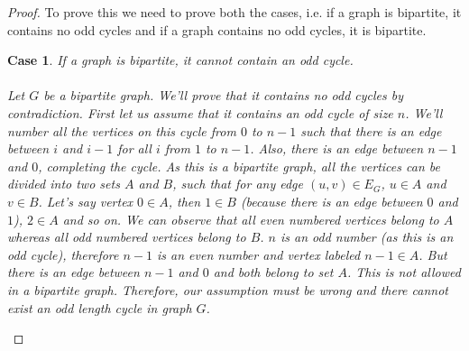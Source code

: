 \documentclass{article}
\newtheorem{case}{Case}
\begin{document}
\begin{proof}
    To prove this we need to prove both the cases, i.e. if a graph is bipartite, it contains no odd cycles and if a graph contains no odd cycles, it is bipartite.\\

    \begin{case}
        If a graph is bipartite, it cannot contain an odd cycle.\\
        \\
        Let $G$ be a bipartite graph. We'll prove that it contains no odd cycles by contradiction. First let us assume that it contains an odd cycle of size $n$. We'll number all the vertices on this cycle from $0$ to $n-1$ such that there is an edge between $i$ and $i-1$ for all $i$ from $1$ to $n-1$. Also, there is an edge between $n-1$ and $0$, completing the cycle. As this is a bipartite graph, all the vertices can be divided into two sets $A$ and $B$, such that for any edge $(u,v) \in E_{G}$, $u \in A$ and $v \in B$. Let's say vertex $0 \in A$, then $1 \in B$ (because there is an edge between $0$ and $1$), $2 \in A$ and so on. We can observe that all even numbered vertices belong to $A$ whereas all odd numbered vertices belong to $B$. $n$ is an odd number (as this is an odd cycle), therefore $n-1$ is an even number and vertex labeled $n-1 \in A$. But there is an edge between $n-1$ and $0$ and both belong to set $A$. This is not allowed in a bipartite graph. Therefore, our assumption must be wrong and there cannot exist an odd length cycle in graph $G$.
    \end{case}


\end{proof}
\end{document}
